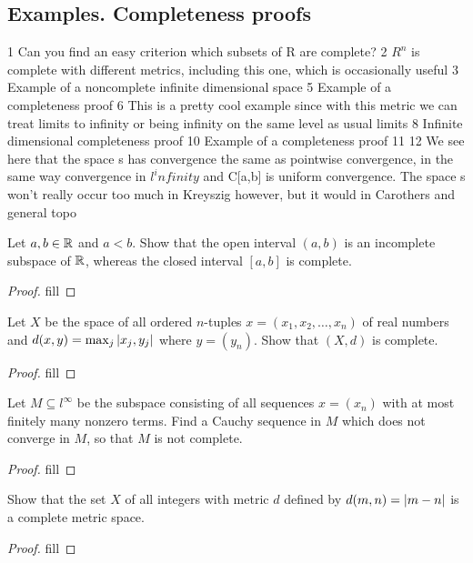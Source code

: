 \subsection{Examples. Completeness proofs}

1 Can you find an easy criterion which subsets of R are complete?
2 $R^n$ is complete with different metrics, including this one, which is occasionally useful
3 Example of a noncomplete infinite dimensional space 
5 Example of a completeness proof
6 This is a pretty cool example since with this metric we can treat limits to infinity or being infinity on the same level as usual limits
8 Infinite dimensional completeness proof 
10 Example of a completeness proof
11
12 We see here that the space s has convergence the same as pointwise convergence, in the same way convergence in $l^infinity$ and C[a,b] is uniform convergence. The space s won't really occur too much in Kreyszig however, but it would in Carothers and general topo

\begin{exercise}{1}
Let $a,b\in\mathbb{R}$ and $a<b$. Show that the open interval $(a,b)$ is an incomplete subspace of $\mathbb{R}$, whereas the closed interval $[a,b]$ is complete.
\end{exercise}
\begin{proof}
fill
\end{proof}

\begin{exercise}{2}
Let $X$ be the space of all ordered $n$-tuples $x=(x_1,x_2,\dots,x_n)$ of real numbers and $d(x,y)=\max_j\left\lvert x_j,y_j\right\rvert$ where $y=(y_n)$. Show that $(X,d)$ is complete.
\end{exercise}
\begin{proof}
fill
\end{proof}

\begin{exercise}{3}
Let $M\subseteq l^\infty$ be the subspace consisting of all sequences $x=(x_n)$ with at most finitely many nonzero terms. Find a Cauchy sequence in $M$ which does not converge in $M$, so that $M$ is not complete.
\end{exercise}
\begin{proof}
fill
\end{proof}

\begin{exercise}{5}
Show that the set $X$ of all integers with metric $d$ defined by $d(m,n)=\left\lvert m-n\right\rvert$ is a complete metric space.
\end{exercise}
\begin{proof}
fill
\end{proof}

